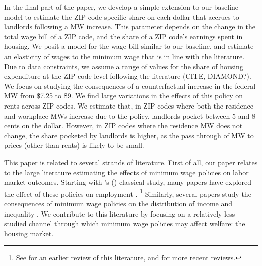 
In the final part of the paper, we develop a simple extension to our baseline model
to estimate the ZIP code-specific share on each dollar that accrues to landlords
following a MW increase.
This parameter depends on the change in the total wage bill of a ZIP code, and the 
share of a ZIP code's earnings spent in housing.
We posit a model for the wage bill similar to our baseline, and estimate an elasticity
of wages to the minimum wage that is in line with the literature. %
Due to data constraints, we assume a range of values for the share of housing
expenditure at the ZIP code level following the literature (CITE, DIAMOND?).
We focus on studying the consequences of a counterfactual increase 
in the federal MW from \$7.25 to \$9.
We find large variations in the effects of this policy on rents across ZIP codes.
We estimate that, in ZIP codes where both the residence and workplace MWs increase
due to the policy, landlords pocket between 5 and 8 cents on the dollar.
However, in ZIP codes where the residence MW does not change, the share pocketed
by landlords is higher, as the pass through of MW to prices (other than rents)
is likely to be small.


This paper is related to several strands of literature.
First of all, our paper relates to the large literature estimating the effects of 
minimum wage policies on labor market outcomes.
Starting with \citeauthor{CardKrueger1994}'s (\citeyear{CardKrueger1994}) classical 
study, many papers have explored the effect of these policies on employment
\parencite[some recent examples include][]{MeerWest2016,CegnizEtAl2019}.%
\footnote{See \textcite{Neumark2006} for an earlier review of this literature,
and \textcite{Dube2019, NeumarkShirley2021} for more recent reviews.}
Similarly, several papers study the consequences of minimum wage policies on the 
distribution of income and inequality \parencite{Lee1999, AutorEtAl2016}.
We contribute to this literature by focusing on a relatively less studied channel
through which minimum wage policies may affect welfare: the housing market.

